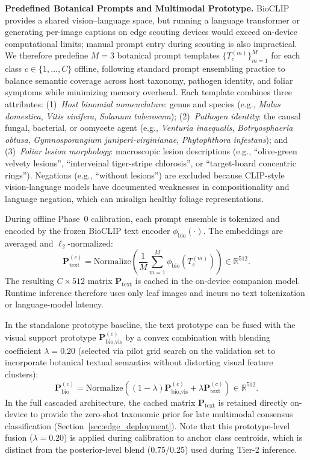 \documentclass[conference]{IEEEtran}
\begin{document}
\textbf{Predefined Botanical Prompts and Multimodal Prototype.} BioCLIP provides a shared vision--language space, but running a language transformer or generating per-image captions on edge scouting devices would exceed on-device computational limits; manual prompt entry during scouting is also impractical. We therefore predefine $M=3$ botanical prompt templates $\{T_c^{(m)}\}_{m=1}^M$ for each class $c \in \{1,\dots,C\}$ offline, following standard prompt ensembling practice to balance semantic coverage across host taxonomy, pathogen identity, and foliar symptoms while minimizing memory overhead. Each template combines three attributes:
(1)~\textit{Host binomial nomenclature}: genus and species (e.g., \textit{Malus domestica}, \textit{Vitis vinifera}, \textit{Solanum tuberosum});
(2)~\textit{Pathogen identity}: the causal fungal, bacterial, or oomycete agent (e.g., \textit{Venturia inaequalis}, \textit{Botryosphaeria obtusa}, \textit{Gymnosporangium juniperi-virginianae}, \textit{Phytophthora infestans}); and
(3)~\textit{Foliar lesion morphology}: macroscopic lesion descriptions (e.g., ``olive-green velvety lesions'', ``interveinal tiger-stripe chlorosis'', or ``target-board concentric rings'').
Negations (e.g., ``without lesions'') are excluded because CLIP-style vision-language models \cite{radford2021clip, yuksekgonul2023when, alhamoud2025vision} have documented weaknesses in compositionality and language negation, which can misalign healthy foliage representations.

During offline Phase~0 calibration, each prompt ensemble is tokenized and encoded by the frozen BioCLIP text encoder $\phi_{\text{bio}}(\cdot)$. The embeddings are averaged and $\ell_2$-normalized:
\begin{equation}
    \mathbf{P}_{\text{text}}^{(c)} = \text{Normalize}\left(\frac{1}{M}\sum_{m=1}^M \phi_{\text{bio}}(T_c^{(m)})\right) \in \mathbb{R}^{512}.
\end{equation}
The resulting $C \times 512$ matrix $\mathbf{P}_{\text{text}}$ is cached in the on-device companion model. Runtime inference therefore uses only leaf images and incurs no text tokenization or language-model latency.

In the standalone prototype baseline, the text prototype can be fused with the visual support prototype $\mathbf{P}_{\text{bio,vis}}^{(c)}$ by a convex combination with blending coefficient $\lambda = 0.20$ (selected via pilot grid search on the validation set to incorporate botanical textual semantics without distorting visual feature clusters):
\begin{equation}
    \mathbf{P}_{\text{bio}}^{(c)} = \text{Normalize}\left((1-\lambda)\mathbf{P}_{\text{bio,vis}}^{(c)} + \lambda \mathbf{P}_{\text{text}}^{(c)}\right) \in \mathbb{R}^{512}.
\end{equation}
In the full cascaded architecture, the cached matrix $\mathbf{P}_{\text{text}}$ is retained directly on-device to provide the zero-shot taxonomic prior for late multimodal consensus classification (Section~\ref{sec:edge_deployment}). Note that this prototype-level fusion ($\lambda=0.20$) is applied during calibration to anchor class centroids, which is distinct from the posterior-level blend (0.75/0.25) used during Tier-2 inference.
\end{document}
